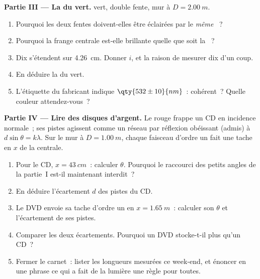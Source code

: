 \begin{problem}
\medskip
\noindent\textbf{Partie III --- La  du
 vert.}  vert, double fente, mur à
$D = \qty{2.00}{m}$.
\begin{enumerate}[resume]
  \item Pourquoi les deux fentes doivent-elles être éclairées par le
        \emph{même} ~?
  \item Pourquoi la frange centrale est-elle brillante quelle que soit
        la ~?
  \item Dix  s'étendent sur \qty{4.26}{cm}. Donner
        $i$, et la raison de mesurer dix d'un coup.
  \item En déduire la  du
         vert.
  \item L'étiquette du fabricant indique $\qty{532 \pm 10}{nm}$~:
        cohérent~? Quelle couleur attendez-vous~?
\end{enumerate}

\medskip
\noindent\textbf{Partie IV --- Lire des disques d'argent.} Le
 rouge frappe un CD en incidence normale~; ses pistes
agissent comme un réseau par réflexion obéissant (admis) à
$d \sin\theta = k\lambda$. Sur le mur à $D = \qty{1.00}{m}$, chaque
faisceau d'ordre un fait une tache en $x$ de la centrale.
\begin{enumerate}[resume]
  \item Pour le CD, $x = \qty{43}{cm}$~: calculer $\theta$. Pourquoi le
        raccourci des petits angles de la partie~I est-il maintenant
        interdit~?
  \item En déduire l'écartement $d$ des pistes du CD.
  \item Le DVD envoie sa tache d'ordre un en $x = \qty{1.65}{m}$~:
        calculer son $\theta$ et l'écartement de ses pistes.
  \item Comparer les deux écartements. Pourquoi un DVD stocke-t-il plus
        qu'un CD~?
  \item Fermer le carnet~: lister les longueurs mesurées ce week-end,
        et énoncer en une phrase ce qui a fait de la lumière une règle
        pour toutes.
\end{enumerate}
\end{problem}
